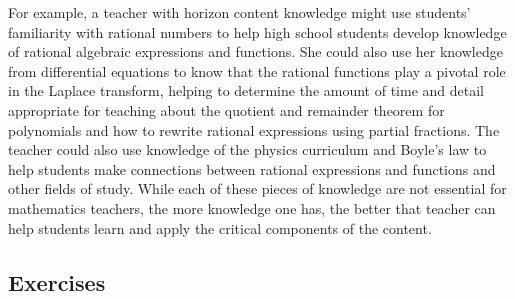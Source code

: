 \documentclass[
]{book}
\theoremstyle{definition}
\theoremstyle{definition}
\theoremstyle{definition}
\theoremstyle{definition}
\theoremstyle{remark}
\begin{document}
For example, a teacher with horizon content knowledge might use students' familiarity with rational numbers to help high school students develop knowledge of rational algebraic expressions and functions. She could also use her knowledge from differential equations to know that the rational functions play a pivotal role in the Laplace transform, helping to determine the amount of time and detail appropriate for teaching about the quotient and remainder theorem for polynomials and how to rewrite rational expressions using partial fractions. The teacher could also use knowledge of the physics curriculum and Boyle's law to help students make connections between rational expressions and functions and other fields of study. While each of these pieces of knowledge are not essential for mathematics teachers, the more knowledge one has, the better that teacher can help students learn and apply the critical components of the content.

\hypertarget{exercises}{%
\subsection{Exercises}\label{exercises}}
\end{document}
